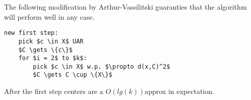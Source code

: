 The following modification by Arthur-Vassilitski guaranties that the algorithm will perform well in any case.
\begin{lstlisting}[caption={kmeans++}, label={lst:arthurv-assilitski}]
new first step:
    pick $c \in X$ UAR
    $C \gets \{c\}$
    for $i = 2$ to $k$:
        pick $c \in X$ w.p. $\propto d(x,C)^2$
        $C \gets C \cup \{X\}$
\end{lstlisting}

\begin{claim}
    After the first step centers are a $O(lg(k))$\-approx in expectation.
\end{claim}